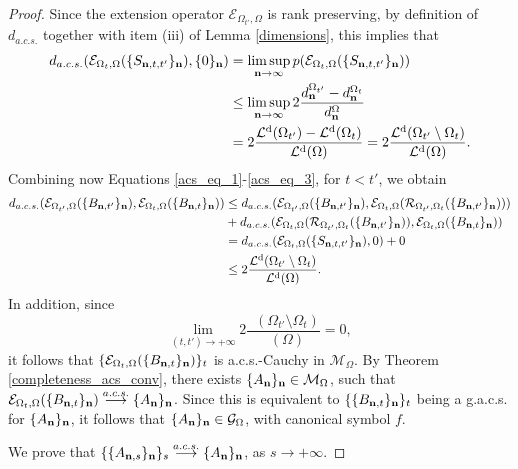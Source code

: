 \documentclass[10pt,a4paper]{amsart}
\DeclareMathOperator{\Ld}{\mathcal{L}^d}
\begin{document}
\begin{proof}
    Since the extension operator $\mathcal{E}_{\Omega_{t'},\Omega}$ is rank preserving, by definition of $d_{a.c.s.}$ together with item (iii) of Lemma \ref{dimensions}, this implies that 
    \begin{align}\label{acs_eq_3}
        d_{a.c.s.}(\mathcal{E}_{\Omega_t,\Omega}(\{S_{\bfn,t,t'}\}_\bfn),\{0\}_\bfn)&=\limsup\limits_{\bfn\to\infty} p(\mathcal{E}_{\Omega_t,\Omega}(\{S_{\bfn,t,t'}\}_\bfn))\\
       \nonumber &\leq\limsup\limits_{\bfn\to\infty}2\frac{d_\bfn^{\Omega_{t'}}-d_\bfn^{\Omega_t}}{d_\bfn^{\Omega}}\\
       \nonumber &=2\frac{\Ld(\Omega_{t'})-\Ld(\Omega_t)}{\Ld(\Omega)}=2\frac{\Ld(\Omega_{t'}\setminus\Omega_t)}{\Ld(\Omega)}.
    \end{align}
    Combining now Equations \eqref{acs_eq_1}-\eqref{acs_eq_3}, for $t<t'$, we obtain
    \begin{align*}
        d_{a.c.s.}(\mathcal{E}_{\Omega_{t'},\Omega}(\{B_{\bfn,t'}\}_\bfn),\mathcal{E}_{\Omega_t,\Omega}(\{B_{\bfn,t}\}_\bfn))&\leq d_{a.c.s.}(\mathcal{E}_{\Omega_{t'},\Omega}(\{B_{\bfn,t'}\}_\bfn),\mathcal{E}_{\Omega_t,\Omega}(\mathcal{R}_{\Omega_{t'},\Omega_t}(\{B_{\bfn,t'}\}_\bfn)))\\
        &+d_{a.c.s.}(\mathcal{E}_{\Omega_t,\Omega}(\mathcal{R}_{\Omega_{t'},\Omega_t}(\{B_{\bfn,t'}\}_\bfn)),\mathcal{E}_{\Omega_t,\Omega}(\{B_{\bfn,t}\}_\bfn))\\
        &=d_{a.c.s.}(\mathcal{E}_{\Omega_t,\Omega}(\{S_{\bfn,t,t'}\}_\bfn),0)+0\\
        &\leq 2\frac{\Ld(\Omega_{t'}\setminus\Omega_t)}{\Ld(\Omega)}.
    \end{align*}
    In addition, since 
    \begin{equation*}
        \lim\limits_{(t,t')\to+\infty}2\frac{\Ld(\Omega_{t'}\setminus\Omega_t)}{\Ld(\Omega)}=0,
    \end{equation*}
   it follows that $\{\mathcal{E}_{\Omega_t,\Omega}(\{B_{\mathbf n,t}\}_\mathbf n)\}_t$ is a.c.s.-Cauchy in $\mathcal{M}_\Omega$. By Theorem \ref{completeness_acs_conv}, there exists $\{A_\mathbf n\}_\mathbf n\in\mathcal{M}_\Omega$, such that $\mathcal{E}_{\Omega_t,\Omega}(\{B_{\mathbf n,t}\}_\mathbf n)\overset{a.c.s.}{\longrightarrow}\{A_\mathbf n\}_\mathbf n$. Since this is equivalent to $\{\{B_{\mathbf n,t}\}_\mathbf n\}_t$ being a g.a.c.s. for $\{A_\mathbf n\}_\mathbf n$, it follows that $\{A_\mathbf n\}_\mathbf n\in\mathcal{G}_{\Omega}$, with canonical symbol $f$. 

    We prove that $\{\{A_{\mathbf n,s}\}_\mathbf n\}_s\overset{a.c.s.}{\longrightarrow}\{A_\mathbf n\}_\mathbf n$, as $s\to+\infty$.
   

\end{proof}
\end{document}
